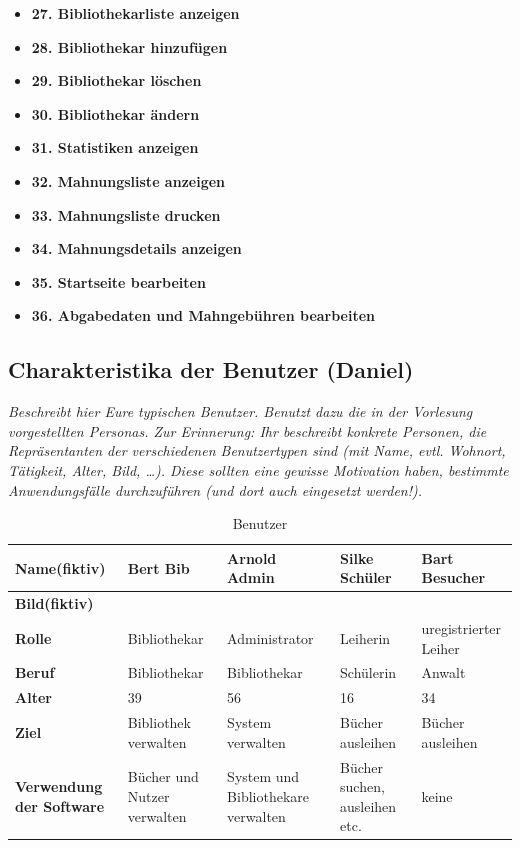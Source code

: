\documentclass[fontsize=12pt,paper=a4,twoside]{scrartcl}
\begin{document}
\begin{itemize}
  \item \textbf{27. Bibliothekarliste anzeigen}
  \item \textbf{28. Bibliothekar hinzufügen}
  \item \textbf{29. Bibliothekar löschen}
  \item \textbf{30. Bibliothekar ändern}
  \item \textbf{31. Statistiken anzeigen}
  \item \textbf{32. Mahnungsliste anzeigen}
  \item \textbf{33. Mahnungsliste drucken}
  \item \textbf{34. Mahnungsdetails anzeigen}
  \item \textbf{35. Startseite bearbeiten}
  \item \textbf{36. Abgabedaten und Mahngebühren bearbeiten}
 \end{itemize}


\subsection{Charakteristika der Benutzer (Daniel)}
  {\em Beschreibt hier Eure typischen Benutzer. Benutzt dazu die in
  der Vorlesung vorgestellten Personas. Zur Erinnerung: Ihr beschreibt
  konkrete Personen, die Repräsentanten der verschiedenen
  Benutzertypen sind (mit Name, evtl. Wohnort, Tätigkeit, Alter, Bild,
  \ldots). Diese sollten eine gewisse Motivation haben, bestimmte
  Anwendungsfälle durchzuführen (und dort auch eingesetzt werden!).}


\begin{table}[htbp]
\caption{Benutzer}
\label{benutzer}
\begin{tabular}{|p{}||p{}|p{}|p{}|p{}|}
\hline 
\textbf{Name(fiktiv)} & Bert Bib & Arnold Admin & Silke Schüler & Bart Besucher\\ \hline
\textbf{Bild(fiktiv)} & & & & \\ \hline
\textbf{Rolle} & Bibliothekar & Administrator & Leiherin & uregistrierter Leiher \\ \hline
\textbf{Beruf} & Bibliothekar & Bibliothekar & Schülerin & Anwalt\\ \hline
\textbf{Alter} & 39 & 56 & 16 & 34\\ \hline
\textbf{Ziel} & Bibliothek verwalten & System verwalten & Bücher ausleihen & Bücher ausleihen \\ \hline
\textbf{Verwendung der Software} & Bücher und Nutzer verwalten & System und Bibliothekare verwalten & Bücher suchen, ausleihen etc. & keine\\ \hline
\end{tabular}
\end{table}
\end{document}
